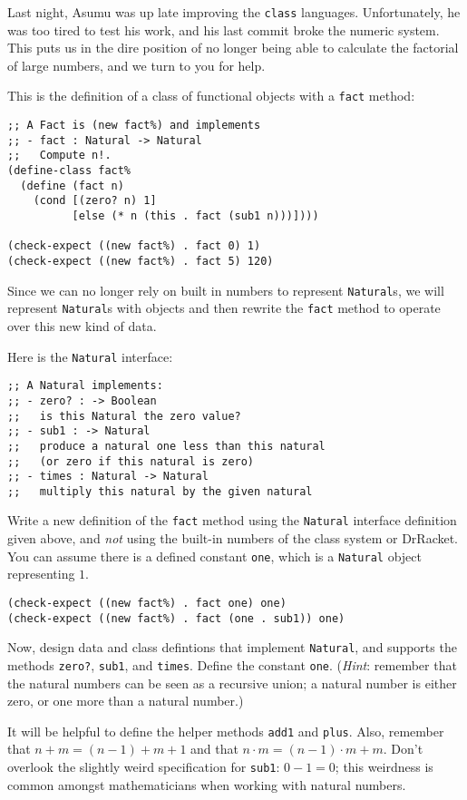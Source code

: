 \documentclass[12pt]{article}                   %
\def\pts#1{\marginpar{\footnotesize \raggedright  \fbox{#1 {\sc Points}}}}
\begin{document}
\begin{problem} \pts{18}
Last night, Asumu was up late improving the {\tt class} languages.
Unfortunately, he was too tired to test his work, and his last commit
broke the numeric system.
%
This puts us in the dire position of no longer being able to calculate
the factorial of large numbers, and we turn to you for help.

This is the definition of a class of functional objects
with a {\tt fact} method:

\begin{verbatim}
;; A Fact is (new fact%) and implements 
;; - fact : Natural -> Natural
;;   Compute n!.
(define-class fact%
  (define (fact n)
    (cond [(zero? n) 1]
          [else (* n (this . fact (sub1 n)))])))

(check-expect ((new fact%) . fact 0) 1)
(check-expect ((new fact%) . fact 5) 120)
\end{verbatim}

Since we can no longer rely on built in numbers to represent
\verb|Natural|s, we will represent \verb|Natural|s with objects and
then rewrite the \verb|fact| method to operate over this new kind of
data.

Here is the \verb|Natural| interface:

\begin{verbatim}
;; A Natural implements:
;; - zero? : -> Boolean
;;   is this Natural the zero value?
;; - sub1 : -> Natural
;;   produce a natural one less than this natural 
;;   (or zero if this natural is zero)
;; - times : Natural -> Natural
;;   multiply this natural by the given natural
\end{verbatim}

\newpage
Write a new definition of the \verb|fact| method using the
\verb|Natural| interface definition given above, and \emph{not} using
the built-in numbers of the class system or DrRacket.  You can assume
there is a defined constant \verb|one|, which is a \verb|Natural|
object representing $1$.

\begin{verbatim}
(check-expect ((new fact%) . fact one) one)
(check-expect ((new fact%) . fact (one . sub1)) one)
\end{verbatim}

\newpage

Now, design data and class defintions that implement \verb|Natural|, and
supports the methods \verb|zero?|, \verb|sub1|, and \verb|times|.
Define the constant \verb|one|.  (\emph{Hint}: remember that the
natural numbers can be seen as a recursive union; a natural number is
either zero, or one more than a natural number.)

It will be helpful to define the helper methods \verb|add1| and
\verb|plus|.  Also, remember that $n + m = (n-1) + m + 1$ and that $n
\cdot m = (n-1) \cdot m + m$.  Don't overlook the slightly weird
specification for \verb|sub1|: $0-1 = 0$; this weirdness is common
amongst mathematicians when working with natural numbers.

\ifrubric
\else
{}
\newpage
\fi
\end{problem}
\end{document}
